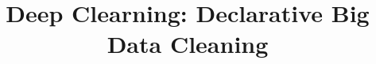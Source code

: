 \documentclass[english]{sig-alternate}
\begin{document}

\linespread{1}%

\title{Deep Clearning: Declarative Big Data Cleaning} 


\iffalse
\author{\alignauthor Sanjay Krishnan,~~Jiannan Wang,~~Sameer Agarwal,~~Michael J. Franklin,~~Ken Goldberg \\
\vspace{.2em}\affaddr{AMPLab, UC Berkeley} \\
\fontsize{9}{10}\selectfont\ttfamily\upshape
\vspace{.1em}\{sanjay,jnwang\}@eecs.berkeley.edu, \{sameerag,franklin\}@cs.berkeley.edu, goldberg@berkeley.edu
}
\fi

\newcommand{\squishlist}{
   \begin{list}{$\bullet$}
    { \setlength{\itemsep}{0pt}
      \setlength{\parsep}{2pt}
      \setlength{\topsep}{6pt}
      \setlength{\partopsep}{0pt}
      \leftmargin=5pt
\rightmargin=0pt
\labelsep=5pt
\labelwidth=10pt
\itemindent=0pt
\listparindent=0pt
\itemsep=\parsep
    }
}
\newcommand{\squishend}{\end{list}}




\newtheorem{theorem}{Theorem}
\newtheorem{example}{Example}
\newtheorem{definition}{Definition}
\newtheorem{proposition}{Proposition}
\newtheorem{lemma}{Lemma}
\newtheorem{corollary}{Corollary}
\newtheorem{demonstration}{Demonstration}

\newcommand{\dataset}{data set\xspace}
\newcommand{\datasets}{data sets\xspace}
\newcommand{\biascorrected}{NormalizedSC\xspace}
\newcommand{\bias}{\biascorrected}
\newcommand{\sampledirty}{{SampleDirty}\xspace}
\newcommand{\sampleclean}{{RawSC}\xspace}
\newcommand{\allclean}{{AllClean}\xspace}
\newcommand{\alldirty}{{AllDirty}\xspace}
\newcommand{\sys}{\textsf{DeepClearner}\xspace}
\newcommand{\projx}{\sys}
\newcommand{\saqp}{SAQP\xspace}
\newcommand{\saqpplus}{\projx}
\newcommand{\blinkdb}{BlinkDB\xspace}
\newcommand{\ctable}{\ensuremath{T^{clean}}\xspace}
\newcommand{\var}{\ensuremath{\texttt{var}}\xspace}
\end{document}
